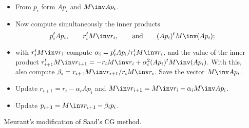 \begin{rfigure}
\begin{itemize}
\item From $p_i$ form $Ap_i$ and $M\inv Ap_i$.
\item Now compute simultaneously the inner products
\[ p_i^tAp_i,\qquad r_i^tM\inv r_i,\qquad\hbox{and}\qquad
    (Ap_i)^tM\inv (Ap_i);\]
\item with $r_i^tM\inv r_i$ compute $\alpha_i = p_i^tAp_i/r_i^tM\inv r_i$,
and the value of the inner product 
$r_{i+1}^tM\inv r_{i+1}=-r_iM\inv r_i +\alpha_i^2(Ap_i)^tM\inv (Ap_i)$.
With this, also compute $\beta_i=r_{i+1}M\inv r_{i+1}/r_iM\inv r_i$.
Save the vector $M\inv Ap_i$.
\item Update $ r_{i+1}= r_i-\alpha_i  Ap_i$
and $M\inv r_{i+1}=M\inv r_i-\alpha_i M\inv Ap_i$.
\item Update $p_{i+1}=M\inv r_{i+1}-\beta_ip_i$.
\end{itemize}
\caption{Meurant's modification of Saad's CG method.}
\label{fig:saad2}
\end{rfigure}
